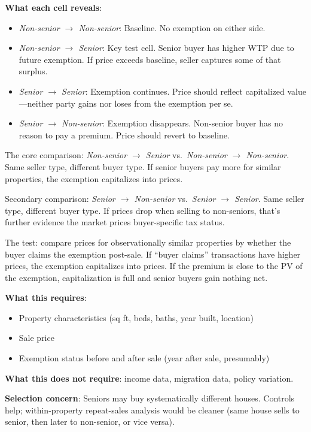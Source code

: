 \documentclass[11pt]{article}
\begin{document}
\textbf{What each cell reveals}:
\begin{itemize}
    \item \textit{Non-senior $\to$ Non-senior}: Baseline. No exemption on either side.
    \item \textit{Non-senior $\to$ Senior}: Key test cell. Senior buyer has higher WTP due to future exemption. If price exceeds baseline, seller captures some of that surplus.
    \item \textit{Senior $\to$ Senior}: Exemption continues. Price should reflect capitalized value---neither party gains nor loses from the exemption per se.
    \item \textit{Senior $\to$ Non-senior}: Exemption disappears. Non-senior buyer has no reason to pay a premium. Price should revert to baseline.
\end{itemize}

The core comparison: \textit{Non-senior $\to$ Senior} vs.\ \textit{Non-senior $\to$ Non-senior}. Same seller type, different buyer type. If senior buyers pay more for similar properties, the exemption capitalizes into prices.

Secondary comparison: \textit{Senior $\to$ Non-senior} vs.\ \textit{Senior $\to$ Senior}. Same seller type, different buyer type. If prices drop when selling to non-seniors, that's further evidence the market prices buyer-specific tax status.

The test: compare prices for observationally similar properties by whether the buyer claims the exemption post-sale. If ``buyer claims'' transactions have higher prices, the exemption capitalizes into prices. If the premium is close to the PV of the exemption, capitalization is full and senior buyers gain nothing net.

\textbf{What this requires}:
\begin{itemize}
    \item Property characteristics (sq ft, beds, baths, year built, location)
    \item Sale price
    \item Exemption status before and after sale (year after sale, presumably)
\end{itemize}

\textbf{What this does not require}: income data, migration data, policy variation.

\textbf{Selection concern}: Seniors may buy systematically different houses. Controls help; within-property repeat-sales analysis would be cleaner (same house sells to senior, then later to non-senior, or vice versa).
\end{document}
